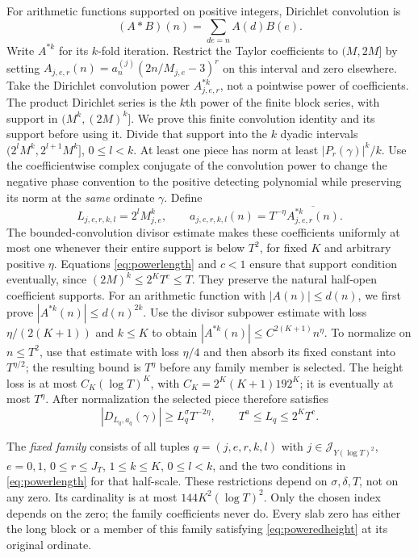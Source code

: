 \documentclass[11pt,a4paper]{article}
\numberwithin{equation}{section}
\theoremstyle{definition}
\begin{document}
For arithmetic functions supported on positive integers, Dirichlet
convolution is
\[
 (A*B)(n)=\sum_{de=n}A(d)B(e).
\]
Write $A^{*k}$ for its $k$-fold iteration. Restrict the Taylor coefficients to
$(M,2M]$ by setting
$A_{j,e,r}(n)=a_n^{(j)}(2n/M_{j,e}-3)^r$
on this interval and zero elsewhere. Take the Dirichlet convolution power
$A_{j,e,r}^{*k}$, not a pointwise power of coefficients.
The product Dirichlet series is the $k$th power of the finite block series,
with support in $(M^k,(2M)^k]$. We prove this finite convolution
identity and its support before using it. Divide that support into the
$k$ dyadic intervals $(2^lM^k,2^{l+1}M^k]$, $0\le l<k$.
At least one piece has norm at least $|P_r(\gamma)|^k/k$.
Use the coefficientwise complex conjugate of the convolution power to change
the negative phase convention to the positive detecting polynomial while
preserving its norm at the \emph{same} ordinate $\gamma$.
Define
\[
 L_{j,e,r,k,l}=2^lM_{j,e}^k,\qquad
 a_{j,e,r,k,l}(n)=T^{-\eta}\overline{A_{j,e,r}^{*k}(n)}.
\]
The bounded-convolution divisor estimate makes these coefficients
uniformly at most one whenever their entire support is below $T^2$, for fixed
$K$ and arbitrary positive $\eta$. Equations \eqref{eq:powerlength} and
$c<1$ ensure that support condition eventually, since
$(2M)^k\le2^KT^c\le T$.
They preserve the natural half-open coefficient supports. For an arithmetic
function with $|A(n)|\le d(n)$, we first prove
$|A^{*k}(n)|\le d(n)^{2k}$. Use the divisor subpower estimate with loss
$\eta/(2(K+1))$ and $k\le K$ to obtain
$|A^{*k}(n)|\le C^{2(K+1)}n^\eta$. To normalize on $n\le T^2$, use that
estimate with loss $\eta/4$ and then absorb its fixed constant into
$T^{\eta/2}$; the resulting bound is $T^\eta$ before any family member
is selected.
The height loss is at most
$C_K(\log T)^K$, with
$C_K=2^K(K+1)192^K$; it is eventually at most $T^\eta$.
After normalization the selected piece therefore satisfies
\begin{equation}\label{eq:poweredheight}
 |D_{L_q,a_q}(\gamma)|\ge L_q^\sigma T^{-2\eta},\qquad
 T^a\le L_q\le2^KT^c.
\end{equation}

The \emph{fixed family} consists of all tuples
$q=(j,e,r,k,l)$ with $j\in\mathcal J_{Y(\log T)^2}$, $e=0,1$, $0\le r\le J_T$,
$1\le k\le K$, $0\le l<k$, and the two conditions in
\eqref{eq:powerlength} for that half-scale. These restrictions depend on
$\sigma,\delta,T$, not on any zero. Its cardinality is at most
$144K^2(\log T)^2$.
Only the chosen index depends on the zero; the family coefficients never do.
Every slab zero has either the long block or a member of this family satisfying
\eqref{eq:poweredheight} at its original ordinate.
\end{document}
